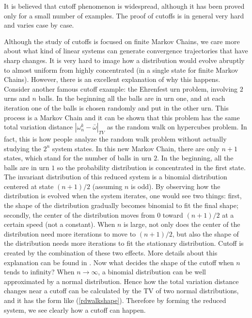 It is believed that cutoff phenomenon is widespread, although it has been proved only for a small
number of examples. The proof of cutoffs is in general very hard and varies case by case.


Although the study of cutoffs is focused on finite Markov Chains, we care more about what kind of
linear systems can generate convergence trajectories that have sharp changes. It is very hard
to image how a distribution would evolve abruptly to almost uniform from highly
concentrated (in a single state for finite Markov Chains). However, there is an excellent
explanation of why this happens. Consider another famous cutoff example: the Ehrenfest urn problem, involving $2$ urns and $n$
balls. In the beginning all the balls are in urn one, and at each iteration one of the balls is
chosen randomly and put in the other urn. This process is a Markov Chain and it can be shown that
this problem has the same total variation distance $|\omega^k_n-\bar{\omega}|_{TV}$ as the random
walk on hypercubes problem. In fact, this is how people analyze the random walk problem without
actually studying the $2^n$ system states. In this new Markov Chain, there are only $n+1$
states, which stand for the number of balls in urn $2$. In the beginning, all the balls are in urn
$1$ so the probability distribution is concentrated in the first state. The invariant distribution
of this reduced system is a binomial distribution centered at state $(n+1)/2$ (assuming $n$ is odd). By observing how the distribution is evolved when the system iterates, one would see two things:
first, the shape of the distribution gradually becomes binomial to fit the final shape; secondly,
the center of the distribution moves from $0$ toward $(n+1)/2$ at a certain speed (not a constant). When $n$ is large, not only does the center of the
distribution need more iterations to move to $(n+1)/2$, but also the shape of the distribution
needs more iterations to fit the stationary distribution. Cutoff is created by the combination of
these two effects. More details about this explanation can be found in \cite{Lloyd2005}. Now what decides the
shape of the cutoff when $n$ tends to infinity? When $n \to \infty$, a binomial distribution
can be well approximated by a normal distribution. Hence how the total variation distance changes near a
cutoff can be calculated by the TV of two normal distributions, and it has the
form like (\ref{rdwalkshape}). Therefore by forming the reduced system, we see clearly how a cutoff
can happen.





